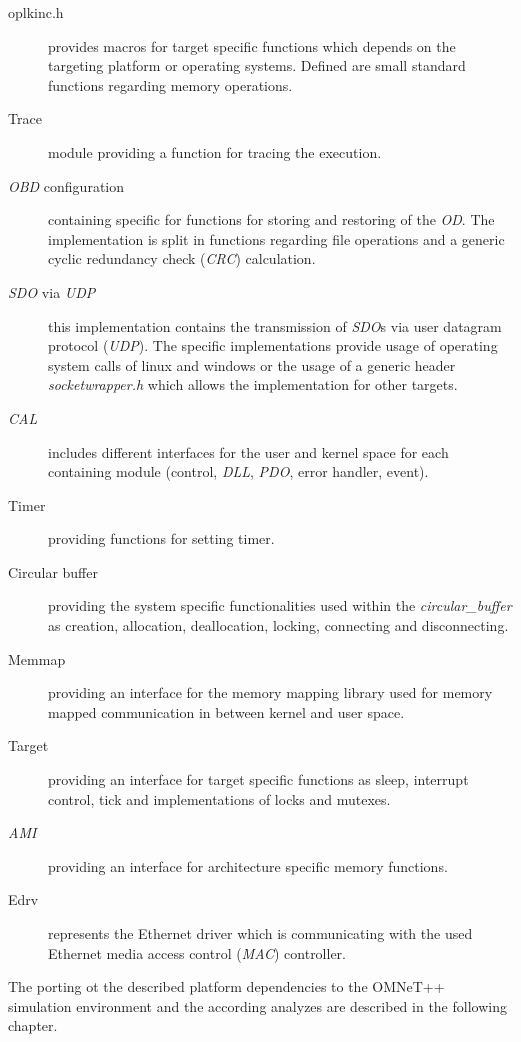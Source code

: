 \begin{description}
    \item[oplkinc.h] provides macros for target specific functions which depends on the targeting platform or operating systems.
    Defined are small standard functions regarding memory operations.
    \item[Trace] module providing a function for tracing the execution.
    \item[\emph{OBD} configuration] containing specific for functions for storing and restoring of the \emph{OD}.
    The implementation is split in functions regarding file operations and a generic cyclic redundancy check (\emph{CRC}) calculation.
    \item[\emph{SDO} via \emph{UDP}] this implementation contains the transmission of \emph{SDO}s via user datagram protocol (\emph{UDP}).
    The specific implementations provide usage of operating system calls of linux and windows or the usage of a generic header \emph{socketwrapper.h} which allows the implementation for other targets.
    \item[\emph{CAL}] includes different interfaces for the user and kernel space for each containing module (control, \emph{DLL}, \emph{PDO}, error handler, event).
    \item[Timer] providing functions for setting timer.
    \item[Circular buffer] providing the system specific functionalities used within the \emph{circular\_buffer} as creation, allocation, deallocation, locking, connecting and disconnecting.
    \item[Memmap] providing an interface for the memory mapping library used for memory mapped communication in between kernel and user space.
    \item[Target] providing an interface for target specific functions as sleep, interrupt control, tick and implementations of locks and mutexes.
    \item[\emph{AMI}] providing an interface for architecture specific memory functions.
    \item[Edrv] represents the Ethernet driver which is communicating with the used Ethernet media access control (\emph{MAC}) controller.
\end{description}

The porting ot the described platform dependencies to the OMNeT++ simulation environment and the according analyzes are described in the following chapter.
